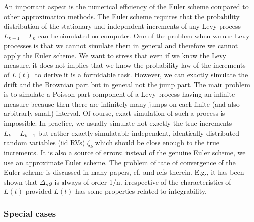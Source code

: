 \documentclass[authoryear,draft,1p,times]{elsarticle}
\renewcommand{\=}{\stackrel{\mathrm{d}}{=}}
\begin{document}
An important aspect is the numerical efficiency of the Euler scheme compared to other approximation methods. 
The Euler  scheme requires that the probability distribution of the stationary and independent  increments 
of any  Levy process $L_{k+1} -L_k$  can be simulated on computer. 
One of the problem when we use Levy processes is that we cannot simulate them in general and therefore  we cannot apply the Euler scheme.  We want to stress that even if we know the Levy measure, it does not  implies that  we know the probability law of the increments of $L(t)$: to derive it is a formidable task. However,  
we can exactly simulate the drift and  the Brownian part but  in general not the jump part.  
  The main problem is to simulate a Poisson part component 
of a Levy process having an infinite measure because then there are infinitely many jumps on each finite  
(and also arbitrarly small) interval. Of course, exact simulation of such a process is impossible.  
In practice, we usually simulate not exactly the true increments $L_{k} -L_{k-1}$   but rather exactly simulatable 
independent, identically distributed random variables (iid RVs) $\zeta_k$ which should be  close enough to the true 
 increments.  It is also a  source of errors: instead of the genuine Euler scheme, we use an approximate Euler scheme. 
The problem of rate of convergence of the Euler scheme is discussed in many papers, cf.  \cite{protter} 
and refs therein. E.g., 
  it has been  shown that  $\Delta_n g$ is always of order 1/n, irrespective of the characteristics of $L(t)$ 
provided  $L(t)$  has some properties related to integrability. 

\subsubsection{Special cases} 
\end{document}
